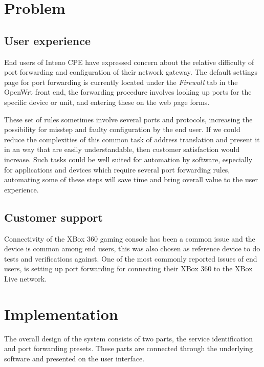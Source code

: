 \documentclass[g5paper,11pt]{kth-bcs}
\begin{document}
\chapter{Problem}
   \section{User experience}
End users of Inteno CPE have expressed concern about the relative difficulty of port forwarding and configuration of their network gateway.
The default settings page for port forwarding is currently located under the \emph{Firewall} tab in the OpenWrt front end, the forwarding procedure involves looking up ports for the specific device or unit, and entering these on the web page forms.

These set of rules sometimes involve several ports and protocols, increasing the possibility for misstep and faulty configuration by the end user.
If we could reduce the complexities of this common task of address translation and present it in an way that are easily understandable, then customer satisfaction would increase.
Such tasks could be well suited for automation by software, especially for applications and devices which require several port forwarding rules, automating some of these steps will save time and bring overall value to the user experience.


   \section{Customer support}
Connectivity of the XBox 360 gaming console has been a common issue and the device is common among end users, this was also chosen as reference device to do tests and verifications against.
One of the most commonly reported issues of end users, is setting up port forwarding for connecting their XBox 360 to the XBox Live network.

\chapter{Implementation}
The overall design of the system consists of two parts, the service identification and port forwarding presets.
These parts are connected through the underlying software and presented on the user interface.
\end{document}
